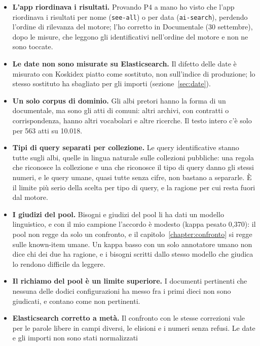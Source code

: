 \begin{itemize}
        abbasserebbero l'MRR@10.
  \item \textbf{L'app riordinava i risultati.} Provando P4 a mano ho visto che
        l'app riordinava i risultati per nome (\texttt{see-all}) o per data
        (\texttt{ai-search}), perdendo l'ordine di rilevanza del motore; l'ho
        corretto in Documentale (30 settembre), dopo le misure, che leggono gli
        identificativi nell'ordine del motore e non ne sono toccate.
  \item \textbf{Le date non sono misurate su Elasticsearch.} Il difetto delle
        date è misurato con Koskidex piatto come sostituto, non sull'indice di
        produzione; lo stesso sostituto ha sbagliato per gli importi
        (sezione~\ref{sec:date}).
  \item \textbf{Un solo corpus di dominio.} Gli albi pretori hanno la forma di un
        documentale, ma sono gli atti di comuni: altri archivi, con contratti o
        corrispondenza, hanno altri vocabolari e altre ricerche. Il testo intero
        c'è solo per 563 atti su 10.018.
  \item \textbf{Tipi di query separati per collezione.} Le query identificative
        stanno tutte sugli albi, quelle in lingua naturale sulle collezioni
        pubbliche: una regola che riconosce la collezione e una che riconosce il
        tipo di query danno gli stessi numeri, e le query umane, quasi tutte
        senza cifre, non bastano a separarle. È il limite più serio della
        scelta per tipo di query, e la ragione per cui resta fuori dal motore.
  \item \textbf{I giudizi del pool.} Bisogni e giudizi del pool li ha dati un
        modello linguistico, e con il mio campione l'accordo è modesto (kappa
        pesato 0,370): il pool non regge da solo un confronto, e il capitolo~\ref{chapter:confronto}
        si regge sulle known-item umane. Un kappa basso con un solo
        annotatore umano non dice chi dei due ha ragione, e i bisogni scritti
        dallo stesso modello che giudica lo rendono difficile da leggere.
  \item \textbf{Il richiamo del pool è un limite superiore.} I documenti pertinenti
        che nessuna delle dodici configurazioni ha messo fra i primi dieci non
        sono giudicati, e contano come non pertinenti.
  \item \textbf{Elasticsearch corretto a metà.} Il confronto con le stesse
        correzioni vale per le parole libere in campi diversi, le elisioni e i
        numeri senza refusi. Le date e gli importi non sono stati normalizzati

\end{itemize}
